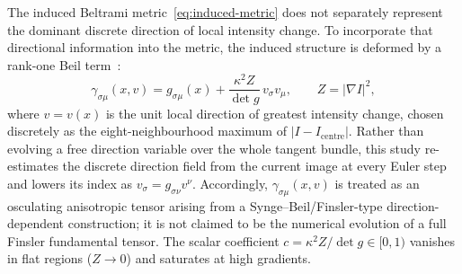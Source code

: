 \documentclass[11pt,a4paper]{article}
\begin{document}
The induced Beltrami metric~\eqref{eq:induced-metric} does not separately represent
the dominant discrete direction of local intensity change. To incorporate that
directional information into the metric, the induced structure is deformed by a
rank-one Beil term~\cite{kilic2022}:
\begin{equation}
\gamma_{\sigma\mu}(x,v)=g_{\sigma\mu}(x)+\frac{\kappa^2 Z}{\det g}\,v_\sigma v_\mu,
\qquad Z=|\nabla I|^2,
\label{eq:beil}
\end{equation}
where $v=v(x)$ is the unit local direction of greatest intensity change, chosen
discretely as the eight-neighbourhood maximum of $|I-I_{\text{centre}}|$. Rather
than evolving a free direction variable over the whole tangent bundle, this study
re-estimates the discrete direction field from the current image at every Euler
step and lowers its index as $v_\sigma=g_{\sigma\nu}v^\nu$. Accordingly,
$\gamma_{\sigma\mu}(x,v)$ is treated as an osculating anisotropic tensor arising
from a Synge--Beil/Finsler-type direction-dependent construction; it is not claimed
to be the numerical evolution of a full Finsler fundamental tensor. The scalar
coefficient $c=\kappa^2 Z/\det g\in[0,1)$ vanishes in flat regions ($Z\to0$) and
saturates at high gradients.
\end{document}
